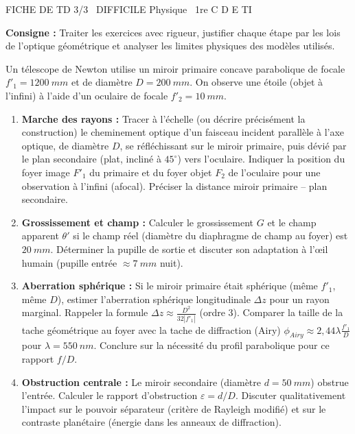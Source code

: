 \documentclass[11pt]{article}
\begin{document}
\begin{tcolorbox}[enhanced,colback=popink,colframe=popink,arc=10pt,boxrule=0pt,left=12pt,right=12pt,top=9pt,bottom=9pt]
{\color{white}\popxbold\small FICHE DE TD 3/3 \textbullet\ DIFFICILE \hfill Physique \textbullet\ 1re C D E TI\par}
\end{tcolorbox}
\vspace{4pt}
\noindent \textbf{Consigne :} Traiter les exercices avec rigueur, justifier chaque étape par les lois de l'optique géométrique et analyser les limites physiques des modèles utilisés.

\begin{exercice}
Un télescope de Newton utilise un miroir primaire concave parabolique de focale $f'_1 = \SI{1200}{mm}$ et de diamètre $D = \SI{200}{mm}$. On observe une étoile (objet à l'infini) à l'aide d'un oculaire de focale $f'_2 = \SI{10}{mm}$.
\begin{enumerate}
    \item \textbf{Marche des rayons :} Tracer à l'échelle (ou décrire précisément la construction) le cheminement optique d'un faisceau incident parallèle à l'axe optique, de diamètre $D$, se réfléchissant sur le miroir primaire, puis dévié par le plan secondaire (plat, incliné à $45^\circ$) vers l'oculaire. Indiquer la position du foyer image $F'_1$ du primaire et du foyer objet $F_2$ de l'oculaire pour une observation à l'infini (afocal). Préciser la distance miroir primaire -- plan secondaire.
    \item \textbf{Grossissement et champ :} Calculer le grossissement $G$ et le champ apparent $\theta'$ si le champ réel (diamètre du diaphragme de champ au foyer) est $\SI{20}{mm}$. Déterminer la pupille de sortie et discuter son adaptation à l'œil humain (pupille entrée $\approx \SI{7}{mm}$ nuit).
    \item \textbf{Aberration sphérique :} Si le miroir primaire était sphérique (même $f'_1$, même $D$), estimer l'aberration sphérique longitudinale $\Delta z$ pour un rayon marginal. Rappeler la formule $\Delta z \approx \frac{D^2}{32 |f'_1|}$ (ordre 3). Comparer la taille de la tache géométrique au foyer avec la tache de diffraction (Airy) $\phi_{Airy} \approx 2,44 \lambda \frac{f'_1}{D}$ pour $\lambda = \SI{550}{nm}$. Conclure sur la nécessité du profil parabolique pour ce rapport $f/D$.
    \item \textbf{Obstruction centrale :} Le miroir secondaire (diamètre $d = \SI{50}{mm}$) obstrue l'entrée. Calculer le rapport d'obstruction $\varepsilon = d/D$. Discuter qualitativement l'impact sur le pouvoir séparateur (critère de Rayleigh modifié) et sur le contraste planétaire (énergie dans les anneaux de diffraction).
\end{enumerate}
\end{exercice}
\end{document}
